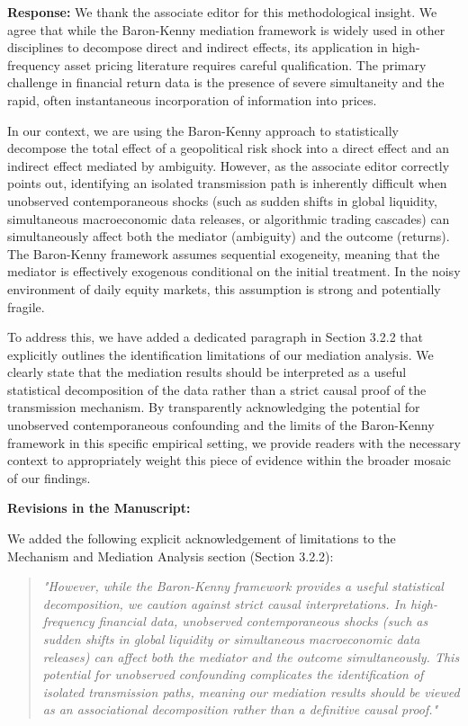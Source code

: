 \documentclass[12pt]{article}
\begin{document}
\begin{highlightbox}
\textbf{Response:} We thank the associate editor for this methodological insight. We agree that while the Baron-Kenny mediation framework is widely used in other disciplines to decompose direct and indirect effects, its application in high-frequency asset pricing literature requires careful qualification. The primary challenge in financial return data is the presence of severe simultaneity and the rapid, often instantaneous incorporation of information into prices. 

In our context, we are using the Baron-Kenny approach to statistically decompose the total effect of a geopolitical risk shock into a direct effect and an indirect effect mediated by ambiguity. However, as the associate editor correctly points out, identifying an isolated transmission path is inherently difficult when unobserved contemporaneous shocks (such as sudden shifts in global liquidity, simultaneous macroeconomic data releases, or algorithmic trading cascades) can simultaneously affect both the mediator (ambiguity) and the outcome (returns). The Baron-Kenny framework assumes sequential exogeneity, meaning that the mediator is effectively exogenous conditional on the initial treatment. In the noisy environment of daily equity markets, this assumption is strong and potentially fragile.

To address this, we have added a dedicated paragraph in Section 3.2.2 that explicitly outlines the identification limitations of our mediation analysis. We clearly state that the mediation results should be interpreted as a useful statistical decomposition of the data rather than a strict causal proof of the transmission mechanism. By transparently acknowledging the potential for unobserved contemporaneous confounding and the limits of the Baron-Kenny framework in this specific empirical setting, we provide readers with the necessary context to appropriately weight this piece of evidence within the broader mosaic of our findings.
\end{highlightbox}

\begin{highlightbox}
\textbf{Revisions in the Manuscript:}

We added the following explicit acknowledgement of limitations to the Mechanism and Mediation Analysis section (Section 3.2.2):
\vspace{0.2cm}
\begin{quote}
\color{red}\itshape "However, while the Baron-Kenny framework provides a useful statistical decomposition, we caution against strict causal interpretations. In high-frequency financial data, unobserved contemporaneous shocks (such as sudden shifts in global liquidity or simultaneous macroeconomic data releases) can affect both the mediator and the outcome simultaneously. This potential for unobserved confounding complicates the identification of isolated transmission paths, meaning our mediation results should be viewed as an associational decomposition rather than a definitive causal proof."
\end{quote}
\end{highlightbox}
\end{document}
